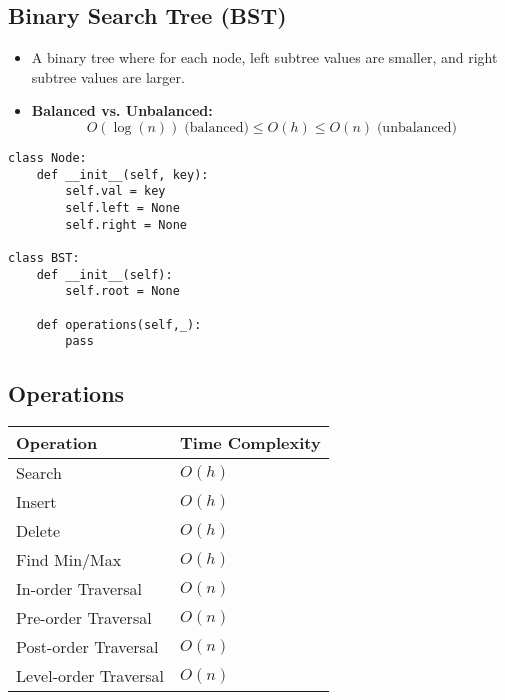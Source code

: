 \subsection{Binary Search Tree (BST)}
\begin{summary}
    \begin{itemize}
        \item A binary tree where for each node, left subtree values are smaller, and right subtree values are larger.
        \item \textbf{Balanced vs. Unbalanced:} 
            \begin{equation*}
                O(\log (n)) \; \text{(balanced)} \leq O(h) \leq O(n) \; \text{(unbalanced)}
            \end{equation*}
    \end{itemize}
\end{summary}

\begin{algo}
\begin{lstlisting}
class Node:
    def __init__(self, key):
        self.val = key
        self.left = None
        self.right = None

class BST:
    def __init__(self):
        self.root = None

    def operations(self,_):
        pass
\end{lstlisting}
\end{algo}
\newpage

\subsection{Operations}
\begin{summary}
    \begin{center}
        \begin{tabular}{ll}
            \toprule
            \textbf{Operation} & \textbf{Time Complexity} \\
            \midrule
            Search & $O(h)$ \\
            \midrule
            Insert & $O(h)$ \\
            \midrule
            Delete & $O(h)$ \\
            \midrule
            Find Min/Max & $O(h)$ \\
            \midrule
            In-order Traversal & $O(n)$ \\
            \midrule
            Pre-order Traversal & $O(n)$ \\
            \midrule
            Post-order Traversal & $O(n)$ \\
            \midrule
            Level-order Traversal & $O(n)$ \\
            \bottomrule
        \end{tabular}
    \end{center}
\end{summary}


